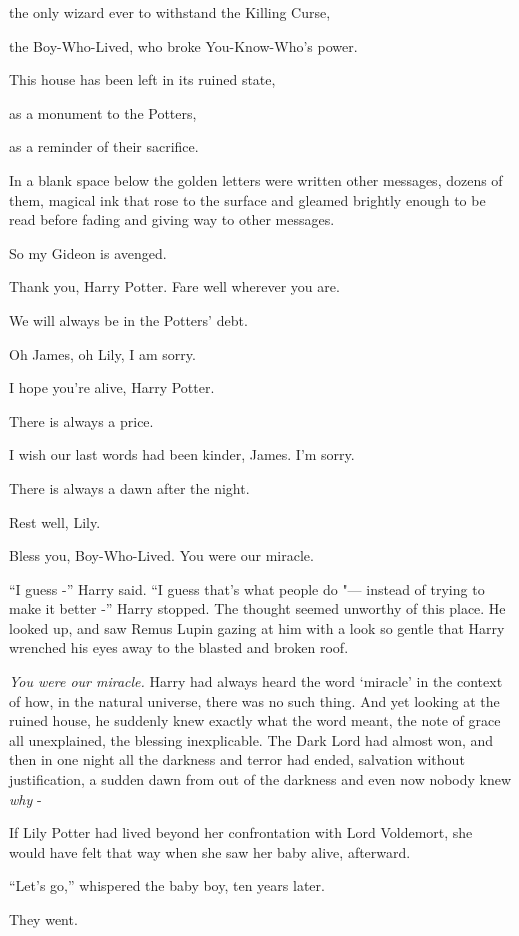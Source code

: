 the only wizard ever to withstand the Killing Curse,

the Boy-Who-Lived, who broke You-Know-Who's power.

This house has been left in its ruined state,

as a monument to the Potters,

as a reminder of their sacrifice.

In a blank space below the golden letters were written other messages,
dozens of them, magical ink that rose to the surface and gleamed
brightly enough to be read before fading and giving way to other
messages.

So my Gideon is avenged.

Thank you, Harry Potter. Fare well wherever you are.

We will always be in the Potters' debt.

Oh James, oh Lily, I am sorry.

I hope you're alive, Harry Potter.

There is always a price.

I wish our last words had been kinder, James. I'm sorry.

There is always a dawn after the night.

Rest well, Lily.

Bless you, Boy-Who-Lived. You were our miracle.

``I guess -'' Harry said. ``I guess that's what people do "--- instead of
trying to make it better -'' Harry stopped. The thought seemed unworthy
of this place. He looked up, and saw Remus Lupin gazing at him with a
look so gentle that Harry wrenched his eyes away to the blasted and
broken roof.

\emph{You were our miracle.} Harry had always heard the word `miracle'
in the context of how, in the natural universe, there was no such thing.
And yet looking at the ruined house, he suddenly knew exactly what the
word meant, the note of grace all unexplained, the blessing
inexplicable. The Dark Lord had almost won, and then in one night all
the darkness and terror had ended, salvation without justification, a
sudden dawn from out of the darkness and even now nobody knew \emph{why}
-

If Lily Potter had lived beyond her confrontation with Lord Voldemort,
she would have felt that way when she saw her baby alive, afterward.

``Let's go,'' whispered the baby boy, ten years later.

They went.

